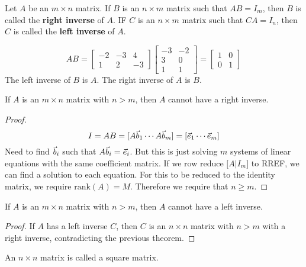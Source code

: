 \documentclass[english, 12pt]{article}
\begin{document}
\begin{defn}
Let $A$ be an $m \times n$ matrix. If $B$ is an $n \times m$ matrix such that $AB = I_m$, then $B$ is called the \textbf{right inverse} of $A$. IF $C$ is an $n \times m$ matrix such that $CA = I_n$, then $C$ is called the \textbf{left inverse} of $A$.
\end{defn}

\begin{exmp}
\[AB = \begin{bmatrix} -2 & -3 & 4 \\ 1 & 2 & -3 \end{bmatrix} \begin{bmatrix} -3 & -2 \\ 3 & 0 \\ 1 & 1 \end{bmatrix} = \begin{bmatrix} 1 & 0 \\ 0 & 1 \end{bmatrix}\]
The left inverse of $B$ is $A$. The right inverse of $A$ is $B$.
\end{exmp}

\begin{thrm}
If $A$ is an $m \times n$ matrix with $n > m$, then $A$ cannot have a right inverse.
\begin{proof}
\[ I = AB = \lbrack A\vec{b}_1 \cdots A\vec{b}_m \rbrack = \lbrack \vec{e}_1 \cdots \vec{e}_m \rbrack\]
Need to find $\vec{b}_i$ such that $A\vec{b}_i = \vec{e}_i$. But this is just solving $m$ systems of linear equations with the same coefficient matrix. If we row reduce $\lbrack A | I_m \rbrack$ to RREF, we can find a solution to each equation. For this to be reduced to the identity matrix, we require $\text{rank}(A) = M$. Therefore we require that $n \geq m$.
\end{proof}
\end{thrm}

\begin{thrm}
If $A$ is an $m \times n$ matrix with $n > m$, then $A$ cannot have a left inverse.
\begin{proof}
If $A$ has a left inverse $C$, then $C$ is an $n \times n$ matrix with $n > m$ with a right inverse, contradicting the previous theorem.
\end{proof}
\end{thrm}

\begin{defn}
An $n \times n$ matrix is called a square matrix.
\end{defn}
\end{document}
